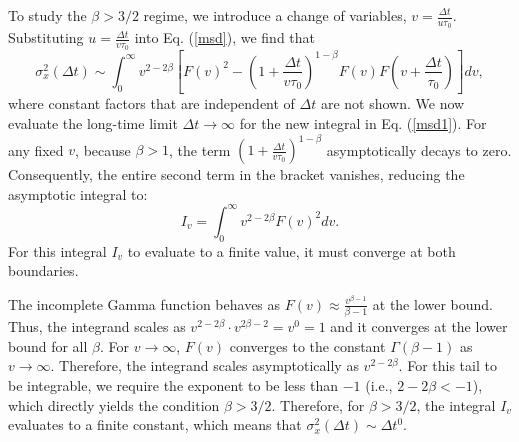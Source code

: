 \documentclass[aps, prl, longbibliography, linenumbers, superscriptaddress]{revtex4-2}
\begin{document}
{To study the $\beta > 3/2$ regime, we introduce a change of variables, $v = \frac{\Delta t}{u\tau_0}$. Substituting $u = \frac{\Delta t}{v\tau_0}$ into Eq. (\ref{msd}), we find that 
\begin{equation}
	\sigma_x^2(\Delta t) \sim \int_0^\infty v^{2-2\beta} \left[ F(v)^2 - \left(1 + \frac{\Delta t}{v\tau_0}\right)^{1-\beta} F(v) F\left(v + \frac{\Delta t}{\tau_0}\right) \right] dv,\label{msd1}
\end{equation}
where constant factors that are independent of $\Delta t$ are not shown. We now evaluate the long-time limit $\Delta t \to \infty$ for the new integral in Eq. (\ref{msd1}). For any fixed $v$, because $\beta > 1$, the term $\left(1 + \frac{\Delta t}{v\tau_0}\right)^{1-\beta}$ asymptotically decays to zero. Consequently, the entire second term in the bracket vanishes, reducing the asymptotic integral to:
\begin{equation}
	I_v = \int_0^\infty v^{2-2\beta} F(v)^2 dv.
\end{equation}
For this integral $I_v$ to evaluate to a finite value, it must converge at both boundaries. 

The incomplete Gamma function behaves as $F(v) \approx \frac{v^{\beta-1}}{\beta-1}$ at the lower bound. Thus, the integrand scales as $v^{2-2\beta} \cdot v^{2\beta-2} = v^0 = 1$ and it converges at the lower bound for all $\beta$. For $v\rightarrow \infty$, $F(v)$ converges to the constant $\Gamma(\beta-1)$ as $v \to \infty$. Therefore, the integrand scales asymptotically as $v^{2-2\beta}$. For this tail to be integrable, we require the exponent to be less than $-1$ (i.e., $2 - 2\beta < -1$), which directly yields the condition $\beta > 3/2$. Therefore, for $\beta > 3/2$, the integral $I_v$ evaluates to a finite constant, which means that $\sigma_x^2(\Delta t) \sim \Delta t^{0}$.


}


\end{document}

